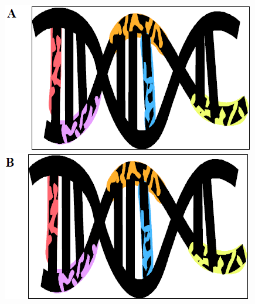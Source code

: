 \begin{figure}[!htb]
\centering
\begin{minipage}{0.45\textwidth}
		\begin{center}
		\includegraphics[width=\textwidth]{graphic/TAMUthesis_exampleA.png}
		\end{center}	
\end{minipage} %
\begin{minipage}{0.45\textwidth}
			\begin{center}
			\includegraphics[width=\textwidth]{graphic/TAMUthesis_exampleB.png}

\end{center}
\end{minipage}
\end{figure}
